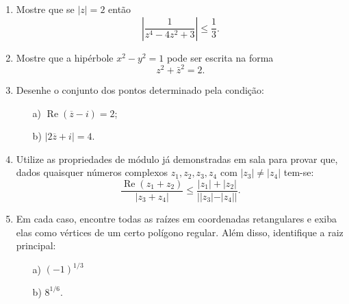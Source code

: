 \documentclass[12pt,reqno]{article}
\numberwithin{equation}{section}
\begin{document}
 \begin{enumerate}
\item Mostre que se $|z|=2$ ent\~ao
\[\left|  \frac{1}{z^4-4z^2+3}  \right| \leq \frac{1}{3}.\]



\item Mostre que a hip\'erbole $x^2 - y^2 = 1$ pode ser escrita na forma
\[z^2+\bar{z}^2 =2.\]


\item Desenhe o conjunto dos pontos determinado pela condi\c c\~ao:
\begin{itemize}
\item[a)] $\operatorname{Re}(\overline{z}-i) = 2$;
\item[b)] $|2\overline{z} +i| = 4$.
\end{itemize}


\item Utilize as propriedades de m\'odulo j\'a demonstradas em sala para provar que, dados quaisquer n\'umeros complexos $z_1,z_2,z_3,z_4$ com $|z_3| \ne |z_4|$ tem-se:
\[\frac{\operatorname{Re}(z_1+z_2)}{|z_3+z_4|} \leq \frac{|z_1|+|z_2|}{||z_3|-|z_4||}.\]


\item  Em cada caso, encontre todas as ra\'izes em coordenadas retangulares e exiba elas como v\'ertices de um certo pol\'igono regular. Al\'em disso, identifique a raiz principal:
\begin{itemize}
\item[a)]$(-1)^{1/3}$
\item[b)] $8^{1/6}$.
\end{itemize}  



\end{enumerate}

 
\end{document}
